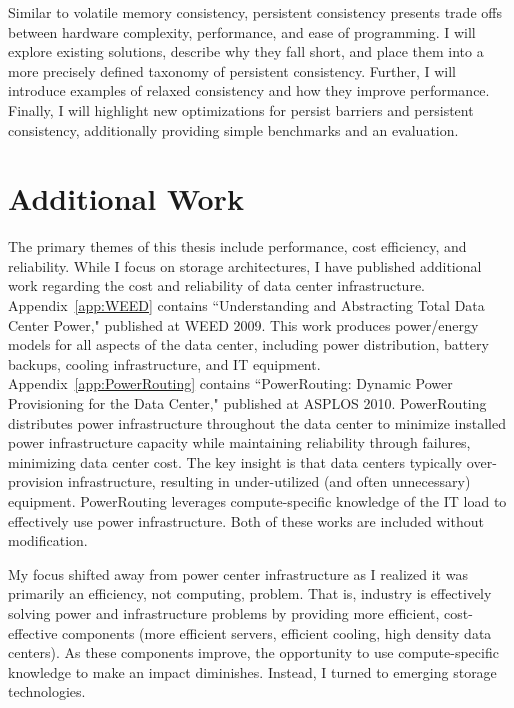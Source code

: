 Similar to volatile memory consistency, persistent consistency presents trade offs between hardware complexity, performance, and ease of programming.
I will explore existing solutions, describe why they fall short, and place them into a more precisely defined taxonomy of persistent consistency.
Further, I will introduce examples of relaxed consistency and how they improve performance.
Finally, I will highlight new optimizations for persist barriers and persistent consistency, additionally providing simple benchmarks and an evaluation.

\section{Additional Work}
\label{sec:Intro:Additional}
The primary themes of this thesis include performance, cost efficiency, and reliability.
While I focus on storage architectures, I have published additional work regarding the cost and reliability of data center infrastructure.
Appendix~\ref{app:WEED} contains ``Understanding and Abstracting Total Data Center Power," \cite{PelleyMeisner09} published at WEED 2009.
This work produces power/energy models for all aspects of the data center, including power distribution, battery backups, cooling infrastructure, and IT equipment.
Appendix~\ref{app:PowerRouting} contains ``PowerRouting: Dynamic Power Provisioning for the Data Center," \cite{PelleyMeisner10} published at ASPLOS 2010.
PowerRouting distributes power infrastructure throughout the data center to minimize installed power infrastructure capacity while maintaining reliability through failures, minimizing data center cost.
The key insight is that data centers typically over-provision infrastructure, resulting in under-utilized (and often unnecessary) equipment.
PowerRouting leverages compute-specific knowledge of the IT load to effectively use power infrastructure.
Both of these works are included without modification.

My focus shifted away from power center infrastructure as I realized it was primarily an efficiency, not computing, problem.
That is, industry is effectively solving power and infrastructure problems by providing more efficient, cost-effective components (more efficient servers, efficient cooling, high density data centers).
As these components improve, the opportunity to use compute-specific knowledge to make an impact diminishes.
Instead, I turned to emerging storage technologies.

